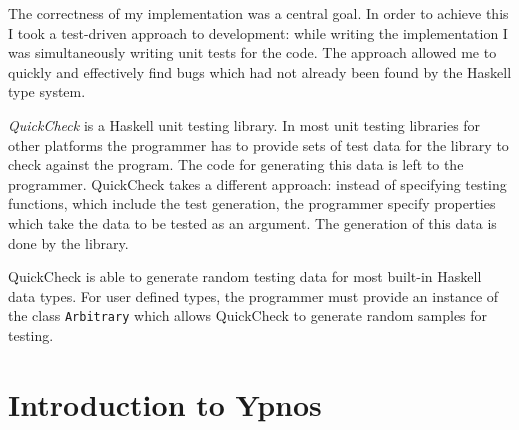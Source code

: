 \documentclass[
    12pt,
    a4paper,
    twoside,
    openright,
    ]{scrbook}
\begin{document}
The correctness of my implementation was a central goal. In order to achieve
this I took a test-driven approach to development: while writing the
implementation I was simultaneously writing unit tests for the code.  The
approach allowed me to quickly and effectively find bugs which had not already
been found by the Haskell type system.

\emph{QuickCheck} is a Haskell unit testing library\cite{claessen2011}. In most
unit testing libraries for other platforms the programmer has to provide sets of
test data for the library to check against the program.  The code for generating
this data is left to the programmer. QuickCheck takes a different approach:
instead of specifying testing functions, which include the test generation, the
programmer specify properties which take the data to be tested as an
argument. The generation of this data is done by the library.

QuickCheck is able to generate random testing data for most built-in Haskell
data types. For user defined types, the programmer must provide an instance of
the class \texttt{Arbitrary} which allows QuickCheck to generate random samples
for testing.


\section{Introduction to Ypnos}
\label{sec:introduction-ypnos}
\end{document}
